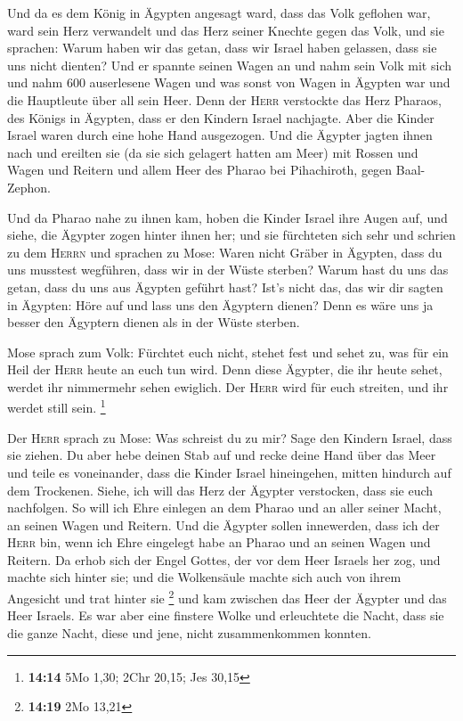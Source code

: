  Und da es dem König in Ägypten angesagt ward, dass das
Volk geflohen war, ward sein Herz verwandelt und das Herz seiner Knechte
gegen das Volk, und sie sprachen: Warum haben wir das getan, dass wir
Israel haben gelassen, dass sie uns nicht dienten?  Und er
spannte seinen Wagen an und nahm sein Volk mit sich  und
nahm 600 auserlesene Wagen und was sonst von Wagen in Ägypten war und
die Hauptleute über all sein Heer.  Denn der \textsc{Herr}
verstockte das Herz Pharaos, des Königs in Ägypten, dass er den Kindern
Israel nachjagte. Aber die Kinder Israel waren durch eine hohe Hand
ausgezogen.  Und die Ägypter jagten ihnen nach und
ereilten sie (da sie sich gelagert hatten am Meer) mit Rossen und Wagen
und Reitern und allem Heer des Pharao bei Pihachiroth, gegen
Baal-Zephon.

 Und da Pharao nahe zu ihnen kam, hoben die Kinder Israel
ihre Augen auf, und siehe, die Ägypter zogen hinter ihnen her; und sie
fürchteten sich sehr und schrien zu dem \textsc{Herrn} 
und sprachen zu Mose: Waren nicht Gräber in Ägypten, dass du uns
musstest wegführen, dass wir in der Wüste sterben? Warum hast du uns das
getan, dass du uns aus Ägypten geführt hast?  Ist's nicht
das, das wir dir sagten in Ägypten: Höre auf und lass uns den Ägyptern
dienen? Denn es wäre uns ja besser den Ägyptern dienen als in der Wüste
sterben.

 Mose sprach zum Volk: Fürchtet euch nicht, stehet fest
und sehet zu, was für ein Heil der \textsc{Herr} heute an euch tun wird.
Denn diese Ägypter, die ihr heute sehet, werdet ihr nimmermehr sehen
ewiglich.  Der \textsc{Herr} wird für euch streiten, und
ihr werdet still sein. \footnote{\textbf{14:14} 5Mo 1,30; 2Chr 20,15;
  Jes 30,15}

 Der \textsc{Herr} sprach zu Mose: Was schreist du zu
mir? Sage den Kindern Israel, dass sie ziehen.  Du aber
hebe deinen Stab auf und recke deine Hand über das Meer und teile es
voneinander, dass die Kinder Israel hineingehen, mitten hindurch auf dem
Trockenen.  Siehe, ich will das Herz der Ägypter
verstocken, dass sie euch nachfolgen. So will ich Ehre einlegen an dem
Pharao und an aller seiner Macht, an seinen Wagen und Reitern.
 Und die Ägypter sollen innewerden, dass ich der
\textsc{Herr} bin, wenn ich Ehre eingelegt habe an Pharao und an seinen
Wagen und Reitern.  Da erhob sich der Engel Gottes, der
vor dem Heer Israels her zog, und machte sich hinter sie; und die
Wolkensäule machte sich auch von ihrem Angesicht und trat hinter sie
\footnote{\textbf{14:19} 2Mo 13,21}  und kam zwischen das
Heer der Ägypter und das Heer Israels. Es war aber eine finstere Wolke
und erleuchtete die Nacht, dass sie die ganze Nacht, diese und jene,
nicht zusammenkommen konnten.

